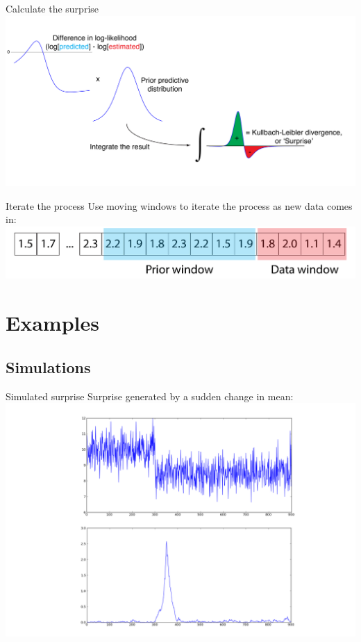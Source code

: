 \documentclass{beamer}
\begin{document}
\begin{frame}{Calculate the surprise}
	\includegraphics[width=\textwidth]{../../figures/hierarchical-surprise}
\end{frame}


\begin{frame}{Iterate the process}
	Use moving windows to iterate the process as new data comes in:
	\includegraphics[width=\textwidth]{../../figures/data-window}
\end{frame}


\section{Examples}
\subsection{Simulations}


\begin{frame}{Simulated surprise}
	Surprise generated by a sudden change in mean:
	\includegraphics[width=\textwidth]{../../figures/mock1}
\end{frame}
\end{document}
